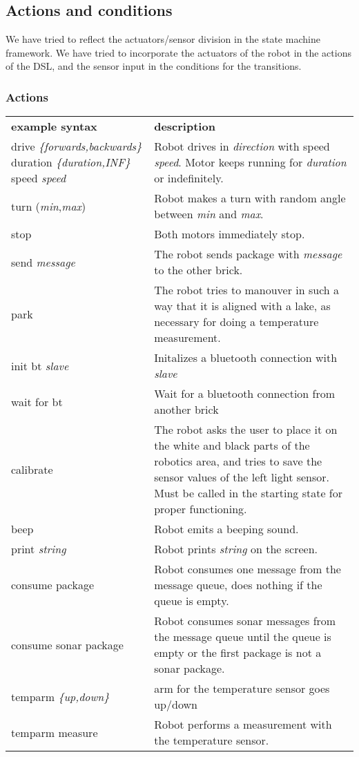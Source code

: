 \documentclass[11pt,a4paper]{article}
\begin{document}
\subsection{Actions and conditions}
We have tried to reflect the actuators/sensor division in the state machine framework. We have tried to incorporate the actuators of the robot in the actions of the DSL, and the sensor input in the conditions for the transitions.

\subsubsection{Actions}
\begin{tabular}{p{6cm}p{10cm}}
\textbf{example syntax} & \textbf{description}\\
drive \emph{\{forwards,backwards\}} duration \emph{\{duration,INF\}} speed \emph{speed} & Robot drives in \emph{direction} with speed \emph{speed}. Motor keeps running for \emph{duration} or indefinitely.\\
turn (\emph{min},\emph{max}) & Robot makes a turn with random angle between \emph{min} and \emph{max}.\\
stop & Both motors immediately stop.\\
send \emph{message} & The robot sends package with \emph{message} to the other brick.\\
park & The robot tries to manouver in such a way that it is aligned with a lake, as necessary for doing a temperature measurement.\\
init bt \emph{slave}& Initalizes a bluetooth connection with \emph{slave}\\
wait for bt & Wait for a bluetooth connection from another brick\\
calibrate & The robot asks the user to place it on the white and black parts of the robotics area, and tries to save the sensor values of the left light sensor. Must be called in the starting state for proper functioning.\\
beep & Robot emits a beeping sound.\\
print \emph{string} & Robot prints \emph{string} on the screen.\\
consume package & Robot consumes one message from the message queue, does nothing if the queue is empty.\\
consume sonar package & Robot consumes sonar messages from the message queue until the queue is empty or the first package is not a sonar package.\\
temparm \emph{\{up,down\}} & arm for the temperature sensor goes up/down\\
temparm measure & Robot performs a measurement with the temperature sensor.\\
\end{tabular}
\end{document}
